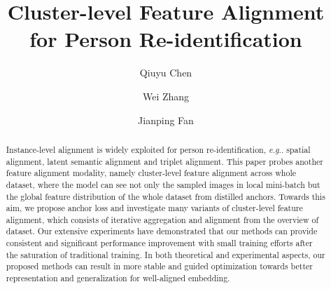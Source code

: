 \documentclass[runningheads]{llncs}
\makeatletter
\DeclareRobustCommand\onedot{\futurelet\@let@token\@onedot}
\def\@onedot{\ifx\@let@token.\else.\null\fi\xspace}
\def\eg{\emph{e.g}\onedot} \def\Eg{\emph{E.g}\onedot}
\makeatother
\begin{document}
\pagestyle{headings}
\mainmatter
\def\ECCVSubNumber{3028}  

\title{Cluster-level Feature Alignment \\ for Person Re-identification} 

\begin{comment}
\titlerunning{ECCV-20 submission ID \ECCVSubNumber} 
\authorrunning{ECCV-20 submission ID \ECCVSubNumber} 
\author{Anonymous ECCV submission}
\institute{Paper ID \ECCVSubNumber}
\end{comment}


\author{Qiuyu Chen \and
Wei Zhang \and
Jianping Fan}
\maketitle

\begin{abstract}
Instance-level alignment is widely exploited for person re-identification, \eg spatial alignment, latent semantic alignment and triplet alignment.
This paper probes another feature alignment modality, namely cluster-level feature alignment across whole dataset, where the model can see not only the sampled images in local mini-batch but the global feature distribution of the whole dataset from distilled anchors. Towards this aim, we propose anchor loss and investigate many variants of cluster-level feature alignment, which consists of iterative aggregation and alignment from the overview of dataset. 
Our extensive experiments have demonstrated that our methods can provide consistent and significant performance improvement with small training efforts after the saturation of traditional training. In both theoretical and experimental aspects, our proposed methods can result in more stable and guided optimization towards better representation and generalization for well-aligned embedding.
\end{abstract}
\end{document}
